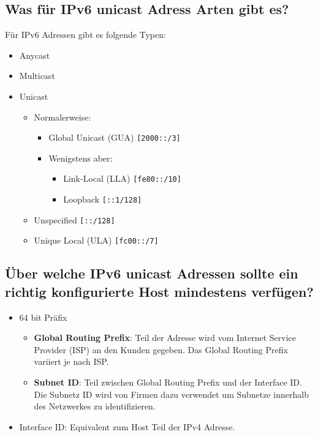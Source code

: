 \subsection*{Was für IPv6 unicast Adress Arten gibt es?}
Für IPv6 Adressen gibt es folgende Typen:
\begin{itemize}
    \item Anycast
    \item Multicast
    \item Unicast
    \begin{itemize}
        \item Normalerweise:
        \begin{itemize}
            \item Global Unicast (GUA) \texttt{[2000::/3]}
            \item Wenigstens aber:
            \begin{itemize}
                \item Link-Local (LLA) \texttt{[fe80::/10]}
                \item Loopback \texttt{[::1/128]}
            \end{itemize}
        \end{itemize}
        \item Unspecified \texttt{[::/128]}
        \item Unique Local (ULA) \texttt{[fc00::/7]}
    \end{itemize}
\end{itemize}

\subsection*{Über welche IPv6 unicast Adressen sollte ein richtig konfigurierte Host mindestens verfügen?}
\begin{itemize}
    \item 64 bit Präfix
    \begin{itemize}
        \item \textbf{Global Routing Prefix}: Teil der Adresse wird vom Internet Service Provider (ISP) an den Kunden gegeben. Das Global Routing Prefix variiert je nach ISP.
        \item \textbf{Subnet ID}: Teil zwischen Global Routing Prefix und der Interface ID. Die Subnetz ID wird von Firmen dazu verwendet um Subnetze innerhalb des Netzwerkes zu identifizieren.
    \end{itemize}
    \item Interface ID: Equivalent zum Host Teil der IPv4 Adresse.
\end{itemize}

